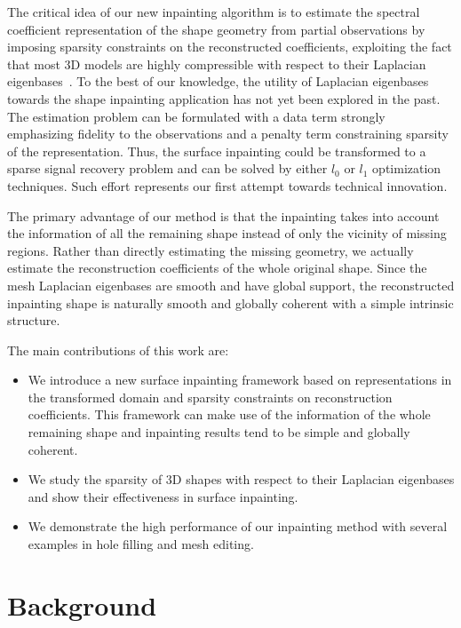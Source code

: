 The critical idea of our new inpainting algorithm is to estimate the
spectral coefficient representation of the shape geometry from partial
observations by imposing sparsity constraints on the reconstructed
coefficients, exploiting the fact that most 3D models are highly
compressible with respect to their Laplacian
eigenbases~\cite{Karni2000}. To the best of our knowledge, the utility
of Laplacian eigenbases towards the shape inpainting application has
not yet been explored in the past. The estimation problem can be
formulated with a data term strongly emphasizing fidelity to the
observations and a penalty term constraining sparsity of the
representation. Thus, the surface inpainting could be transformed to a
sparse signal recovery problem and can be solved by either $l_0$ or
$l_1$ optimization techniques. Such effort represents our first
attempt towards technical innovation.

The primary advantage of our method is that the inpainting takes into
account the information of all the remaining shape instead of only the
vicinity of missing regions. Rather than directly estimating the
missing geometry, we actually estimate the reconstruction coefficients
of the whole original shape. Since the mesh Laplacian eigenbases are
smooth and have global support, the reconstructed inpainting shape is
naturally smooth and globally coherent with a simple intrinsic
structure.

The main contributions of this work are:
\begin{itemize}

\item We introduce a new surface inpainting framework based on
  representations in the transformed domain and sparsity constraints
  on reconstruction coefficients. This framework can make use of the
  information of the whole remaining shape and inpainting results
  tend to be simple and globally coherent.

\item We study the sparsity of 3D shapes with respect to their
  Laplacian eigenbases and show their effectiveness in surface
  inpainting.

\item We demonstrate the high performance of our inpainting method
  with several examples in hole filling and mesh editing.

\end{itemize}


\section{Background}
\label{sec:related}


